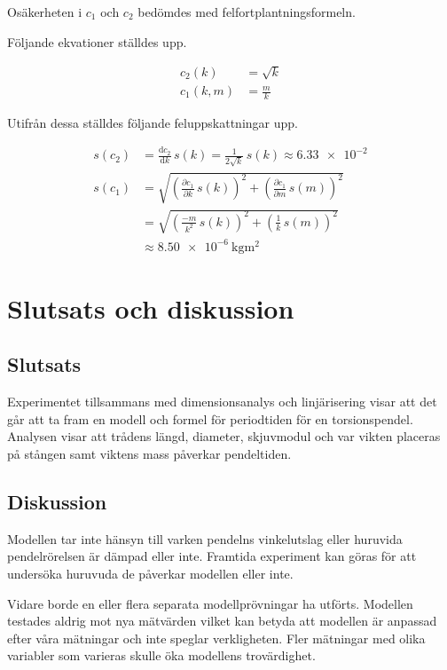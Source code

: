 \documentclass[a4paper,12pt]{article}
\newcommand*{\dd}{\mathrm{d}}
\begin{document}
Osäkerheten i $c_1$ och $c_2$ bedömdes med felfortplantningsformeln.

Följande ekvationer ställdes upp.

\begin{align}
  c_2(k) &= \sqrt{k} \\
  c_1(k, m) &= \frac{m}{k}
\end{align} 

Utifrån dessa ställdes följande feluppskattningar upp.

\begin{align}
  s(c_2) &= \frac{\dd c_2}{\dd k} \, s(k) = \frac{1}{2\sqrt{k}} \, s(k) \approx \num{6.33e-2} \\
  s(c_1) &= \sqrt{\left( \frac{\partial c_1}{\partial k} \, s(k) \right)^2 + \left( \frac{\partial c_1}{\partial m} \, s(m) \right)^2} \nonumber \\
         &= \sqrt{\left( \frac{-m}{k^2} \, s(k) \right)^2 + \left( \frac{1}{k} \, s(m) \right)^2} \nonumber \\
  &\approx \SI{8.50e-6}{\kilogram \meter \squared}
\end{align}

\clearpage

\section{Slutsats och diskussion}

\subsection*{Slutsats}

Experimentet tillsammans med dimensionsanalys och linjärisering visar att det
går att ta fram en modell och formel för periodtiden för en torsionspendel.
Analysen visar att trådens längd, diameter, skjuvmodul och var vikten placeras
på stången samt viktens mass påverkar pendeltiden. 

\subsection*{Diskussion}

Modellen tar inte hänsyn till varken pendelns vinkelutslag eller huruvida
pendelrörelsen är dämpad eller inte. Framtida experiment kan göras för att
undersöka huruvuda de påverkar modellen eller inte.

Vidare borde en eller flera separata modellprövningar ha utförts. Modellen
testades aldrig mot nya mätvärden vilket kan betyda att modellen är anpassad
efter våra mätningar och inte speglar verkligheten. Fler mätningar med olika
variabler som varieras skulle öka modellens trovärdighet.
\end{document}
